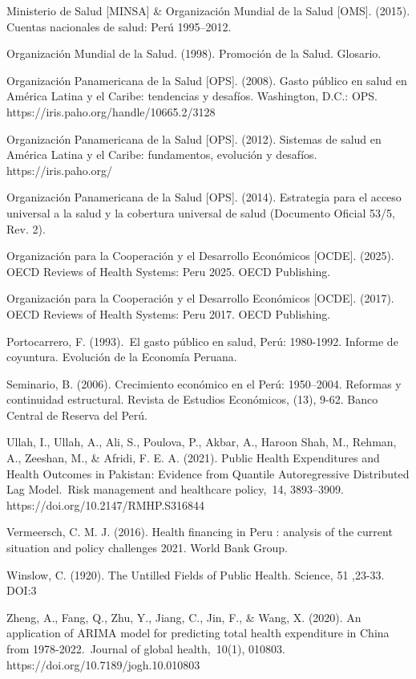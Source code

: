 \documentclass[12pt]{article}
\begin{document}
Ministerio de Salud [MINSA] \& Organización Mundial de la Salud [OMS]. (2015). Cuentas nacionales de salud: Perú 1995–2012. 

Organización Mundial de la Salud. (1998). Promoción de la Salud. Glosario.  

Organización Panamericana de la Salud [OPS]. (2008). Gasto público en salud en América Latina y el Caribe: tendencias y desafíos. Washington, D.C.: OPS. https://iris.paho.org/handle/10665.2/3128

Organización Panamericana de la Salud [OPS]. (2012). Sistemas de salud en América Latina y el Caribe: fundamentos, evolución y desafíos. https://iris.paho.org/

Organización Panamericana de la Salud [OPS]. (2014). Estrategia para el acceso universal a la salud y la cobertura universal de salud (Documento Oficial 53/5, Rev. 2). 

Organización para la Cooperación y el Desarrollo Económicos [OCDE]. (2025). OECD Reviews of Health Systems: Peru 2025. OECD Publishing.

Organización para la Cooperación y el Desarrollo Económicos [OCDE]. (2017). OECD Reviews of Health Systems: Peru 2017. OECD Publishing.

Portocarrero, F. (1993). El gasto público en salud, Perú: 1980-1992. Informe de coyuntura. Evolución de la Economía Peruana.

Seminario, B. (2006). Crecimiento económico en el Perú: 1950–2004. Reformas y continuidad estructural. Revista de Estudios Económicos, (13), 9-62. Banco Central de Reserva del Perú.

Ullah, I., Ullah, A., Ali, S., Poulova, P., Akbar, A., Haroon Shah, M., Rehman, A., Zeeshan, M., \& Afridi, F. E. A. (2021). Public Health Expenditures and Health Outcomes in Pakistan: Evidence from Quantile Autoregressive Distributed Lag Model. Risk management and healthcare policy, 14, 3893–3909. https://doi.org/10.2147/RMHP.S316844

Vermeersch, C. M. J. (2016). Health financing in Peru : analysis of the current situation and policy challenges 2021. World Bank Group.

Winslow, C. (1920). The Untilled Fields of Public Health. Science, 51 ,23-33. DOI:3

Zheng, A., Fang, Q., Zhu, Y., Jiang, C., Jin, F., \& Wang, X. (2020). An application of ARIMA model for predicting total health expenditure in China from 1978-2022. Journal of global health, 10(1), 010803. https://doi.org/10.7189/jogh.10.010803
\end{document}
